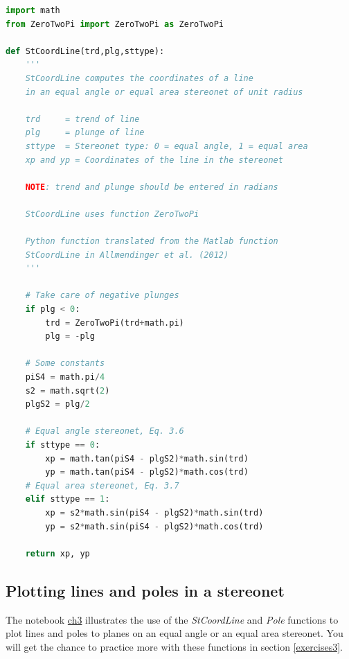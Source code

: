 \documentclass[a4paper , 12pt]{book}
\begin{document}
\begin{center}
\begin{lstlisting}[language=Python, frame=single]
import math
from ZeroTwoPi import ZeroTwoPi as ZeroTwoPi

def StCoordLine(trd,plg,sttype):
    '''
    StCoordLine computes the coordinates of a line 
    in an equal angle or equal area stereonet of unit radius
    
    trd  	= trend of line
    plg  	= plunge of line
    sttype 	= Stereonet type: 0 = equal angle, 1 = equal area
    xp and yp = Coordinates of the line in the stereonet

    NOTE: trend and plunge should be entered in radians

    StCoordLine uses function ZeroTwoPi
    
    Python function translated from the Matlab function 
    StCoordLine in Allmendinger et al. (2012)
    '''
    
    # Take care of negative plunges
    if plg < 0:
        trd = ZeroTwoPi(trd+math.pi)
        plg = -plg
        
    # Some constants
    piS4 = math.pi/4
    s2 = math.sqrt(2)
    plgS2 = plg/2
        
    # Equal angle stereonet, Eq. 3.6
    if sttype == 0:
        xp = math.tan(piS4 - plgS2)*math.sin(trd)
        yp = math.tan(piS4 - plgS2)*math.cos(trd)
    # Equal area stereonet, Eq. 3.7
    elif sttype == 1:
        xp = s2*math.sin(piS4 - plgS2)*math.sin(trd)
        yp = s2*math.sin(piS4 - plgS2)*math.cos(trd)
    
    return xp, yp
\end{lstlisting}   
\end{center}

\subsection{Plotting lines and poles in a stereonet}
The notebook \href{https://github.com/nfcd/compGeo/blob/master/source/notebooks/ch3.ipynb}{ch3} illustrates the use of the \textit{StCoordLine} and \textit{Pole} functions to plot lines and poles to planes on an equal angle or an equal area stereonet. You will get the chance to practice more with these functions in section \ref{exercises3}.
\end{document}

